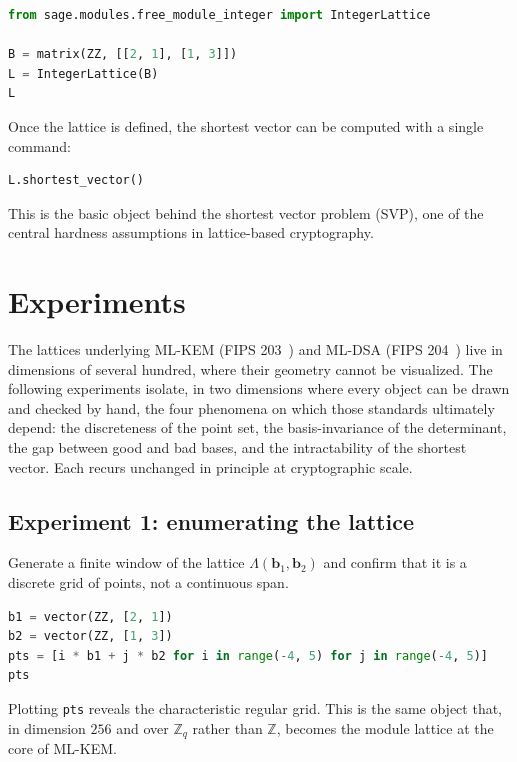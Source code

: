 \begin{lstlisting}[language=Python]
from sage.modules.free_module_integer import IntegerLattice

B = matrix(ZZ, [[2, 1], [1, 3]])
L = IntegerLattice(B)
L
\end{lstlisting}

Once the lattice is defined, the shortest vector can be computed with a single command:

\begin{lstlisting}[language=Python]
L.shortest_vector()
\end{lstlisting}

This is the basic object behind the shortest vector problem (SVP), one of the central hardness assumptions in lattice-based cryptography.

\section{Experiments}

The lattices underlying ML-KEM (FIPS 203~\cite{fips203}) and ML-DSA (FIPS 204~\cite{fips204}) live in dimensions of several hundred, where their geometry cannot be visualized. The following experiments isolate, in two dimensions where every object can be drawn and checked by hand, the four phenomena on which those standards ultimately depend: the discreteness of the point set, the basis-invariance of the determinant, the gap between good and bad bases, and the intractability of the shortest vector. Each recurs unchanged in principle at cryptographic scale.

\subsection{Experiment 1: enumerating the lattice}
Generate a finite window of the lattice $\Lambda(\mathbf{b}_1,\mathbf{b}_2)$ and confirm that it is a discrete grid of points, not a continuous span.

\begin{lstlisting}[language=Python]
b1 = vector(ZZ, [2, 1])
b2 = vector(ZZ, [1, 3])
pts = [i * b1 + j * b2 for i in range(-4, 5) for j in range(-4, 5)]
pts
\end{lstlisting}

Plotting \texttt{pts} reveals the characteristic regular grid. This is the same object that, in dimension $256$ and over $\mathbb{Z}_q$ rather than $\mathbb{Z}$, becomes the module lattice at the core of ML-KEM.

